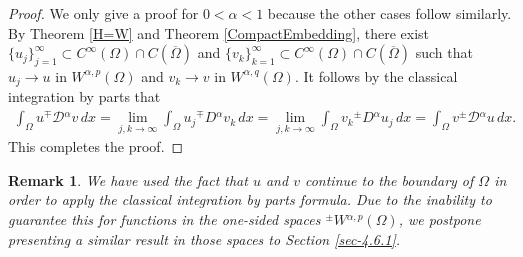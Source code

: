 \documentclass[leqno,final]{siamltex}
\numberwithin{equation}{section}
\newtheorem{remark}{Remark}[section]
\renewcommand{\(}{\bigl(}
\renewcommand{\)}{\bigr)}
\begin{document}
    \begin{proof}
        We only give a proof for $0 < \alpha <1$ because the other cases follow similarly. By Theorem \ref{H=W} and Theorem \ref{CompactEmbedding}, there exist  $\{u_j\}_{j=1}^{\infty} \subset C^{\infty}(\Omega) \cap C(\overline{\Omega})$ and $\{v_k\}_{k=1}^{\infty}\subset C^{\infty}(\Omega) \cap C(\overline{\Omega})$ such that $u_j\to u$ in $W^{\alpha,p}(\Omega)$ and $v_k\to v$
        in $W^{\alpha,q}(\Omega)$. It follows by the classical integration by parts that 
        \begin{align*}
            \int_{\Omega} u {^{\mp}}{\mathcal{D}}{^{\alpha}} v \,dx= \lim_{j,k \rightarrow \infty} \int_{\Omega} u_j {^{\mp}}{D}{^{\alpha}} v_k\, dx = \lim_{j,k \rightarrow \infty} \int_{\Omega} v_k {^{\pm}}{D}{^{\alpha}} u_j \, dx
            = \int_{\Omega} v {^{\pm}}{\mathcal{D}}{^{\alpha}} u\, dx. 
        \end{align*}
        This completes the proof.
    \end{proof}
    
    \begin{remark}
        We have used the fact that $u$ and $v$ continue to the boundary of $\Omega$ in order to apply the classical integration by parts formula. Due to the inability to guarantee this for functions 
        in the one-sided spaces ${^{\pm}}{W}{^{\alpha,p}}(\Omega)$, we postpone 
        presenting a similar result in those spaces to Section \ref{sec-4.6.1}. 
    \end{remark}
    
    
    
\end{document}
